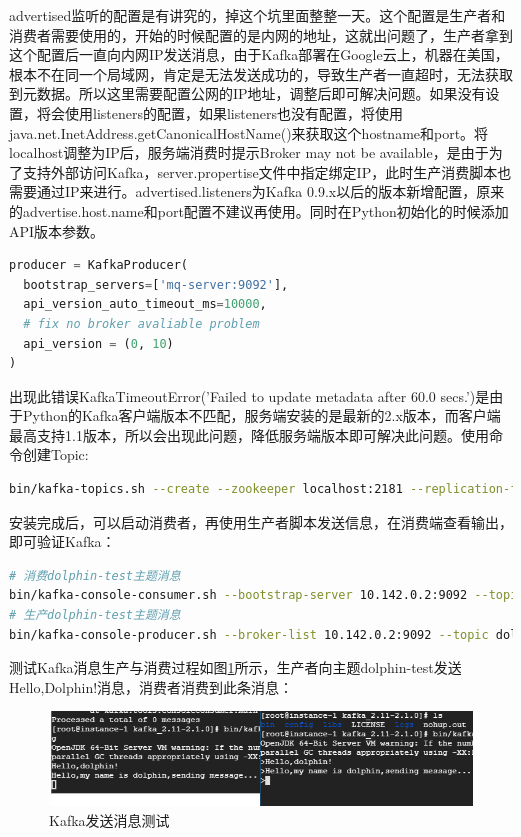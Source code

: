 \documentclass[8pt]{book}
\numberwithin{dummy}{section}
\theoremstyle{ocrenumbox}
\theoremstyle{blacknumex}
\theoremstyle{blacknumbox}
\theoremstyle{ocrenum}
\begin{document}
advertised监听的配置是有讲究的，掉这个坑里面整整一天。这个配置是生产者和消费者需要使用的，开始的时候配置的是内网的地址，这就出问题了，生产者拿到这个配置后一直向内网IP发送消息，由于Kafka部署在Google云上，机器在美国，根本不在同一个局域网，肯定是无法发送成功的，导致生产者一直超时，无法获取到元数据。所以这里需要配置公网的IP地址，调整后即可解决问题。如果没有设置，将会使用listeners的配置，如果listeners也没有配置，将使用java.net.InetAddress.getCanonicalHostName()来获取这个hostname和port。将localhost调整为IP后，服务端消费时提示Broker may not be available，是由于为了支持外部访问Kafka，server.propertise文件中指定绑定IP，此时生产消费脚本也需要通过IP来进行。advertised.listeners为Kafka 0.9.x以后的版本新增配置，原来的advertise.host.name和port配置不建议再使用。同时在Python初始化的时候添加API版本参数。

\begin{lstlisting}[language=Python]
producer = KafkaProducer(
  bootstrap_servers=['mq-server:9092'],
  api_version_auto_timeout_ms=10000,
  # fix no broker avaliable problem
  api_version = (0, 10)
)
\end{lstlisting}

出现此错误KafkaTimeoutError('Failed to update metadata after 60.0 secs.')是由于Python的Kafka客户端版本不匹配，服务端安装的是最新的2.x版本，而客户端最高支持1.1版本，所以会出现此问题，降低服务端版本即可解决此问题。使用命令创建Topic:

\begin{lstlisting}[language=Bash]
bin/kafka-topics.sh --create --zookeeper localhost:2181 --replication-factor 1 --partitions 1 --topic dolphin-test
\end{lstlisting}

安装完成后，可以启动消费者，再使用生产者脚本发送信息，在消费端查看输出，即可验证Kafka：

\begin{lstlisting}[language=Bash]
# 消费dolphin-test主题消息
bin/kafka-console-consumer.sh --bootstrap-server 10.142.0.2:9092 --topic dolphin-spider-google-book-bookinfo --from-beginning
# 生产dolphin-test主题消息
bin/kafka-console-producer.sh --broker-list 10.142.0.2:9092 --topic dolphin-test
\end{lstlisting}

测试Kafka消息生产与消费过程如图\ref{fig:kafkasendingmessagetest}所示，生产者向主题dolphin-test发送Hello,Dolphin!消息，消费者消费到此条消息：

\begin{figure}[htbp]
	\centering
	\includegraphics[scale=0.7]{kafkasendingmessagetest.png}
	\caption{Kafka发送消息测试}
	\label{fig:kafkasendingmessagetest}
\end{figure}
\end{document}
